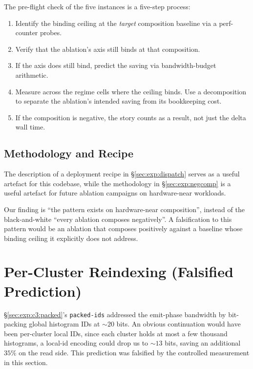 The pre-flight check of the five instances is a five-step process:

\begin{enumerate}
  \item Identify the binding ceiling at the \emph{target} composition baseline via a perf-counter probes.
  \item Verify that the ablation's axis still binds at that composition.
  \item If the axis does still bind, predict the saving via bandwidth-budget arithmetic.
  \item Measure across the regime cells where the ceiling binds. Use a decomposition to separate the ablation's intended saving from its bookkeeping cost.
  \item If the composition is negative, the story counts as a result, not just the delta wall time.
\end{enumerate}


\subsection{Methodology and Recipe\label{sec:exp:negcomp:methodology}}

The description of a deployment recipe in §\ref{sec:exp:dispatch} serves as a useful artefact for this codebase, while the methodology in §\ref{sec:exp:negcomp} is a useful artefact for future ablation campaigns on hardware-near workloads.

Our finding is ``the pattern exists on hardware-near composition'', instead of the black-and-white ``every ablation composes negatively''. A falsification to this pattern would be an ablation that composes positively against a baseline whose binding ceiling it explicitly does not address.

\section{Per-Cluster Reindexing (Falsified Prediction)\label{sec:exp:reindex}}

§\ref{sec:exp:c3:packed}'s \texttt{packed-ids} addressed the emit-phase bandwidth by bit-packing global histogram IDs at ${\sim}20$ bits. An obvious continuation would have been per-cluster local IDs, since each cluster holds at most a few thousand histograms, a local-id encoding could drop us to ${\sim}13$ bits, saving an additional $35\%$ on the read side. This prediction was falsified by the controlled measurement in this section. 


